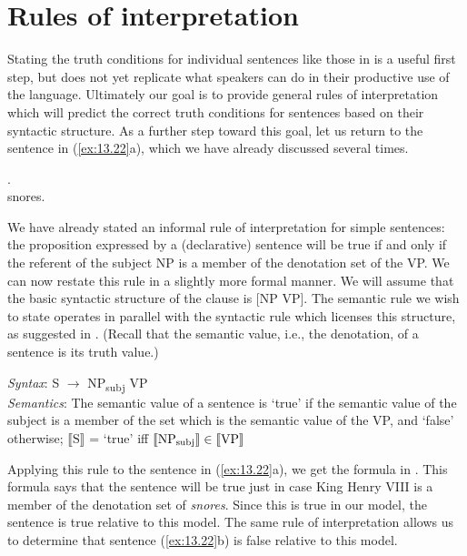 \pagebreak\section{Rules of interpretation}\label{sec:13.5}

Stating the truth conditions for individual sentences like those in  is a useful first step, but does not yet replicate what speakers can do in their productive use of the language. Ultimately our goal is to provide general rules of interpretation which will predict the correct truth conditions for sentences based on their syntactic structure. As a further step toward this goal, let us return to the sentence in (\ref{ex:13.22}a), which we have already discussed several times.


\ea \label{ex:13.22}
.\\
  {snores}.
                       \z
\z


We have already stated an informal rule of interpretation for simple sentences: the proposition expressed by a (declarative) sentence will be true if and only if the referent of the subject NP is a member of the denotation set of the VP. We can now restate this rule in a slightly more formal manner. We will assume that the basic syntactic structure of the clause is [NP VP]. The semantic rule we wish to state operates in parallel with the syntactic rule which licenses this structure, as suggested in . (Recall that the semantic value, i.e., the denotation, of a sentence is its truth value.)


\ea \label{ex:13.23}
\textit{Syntax}: S  $\rightarrow$  NP\textsubscript{subj}  VP\\
\textit{Semantics}: The semantic value of a sentence is ‘true’ if the semantic value of the subject is a member of the set which is the semantic value of the VP, and ‘false’ otherwise; {}$\llbracket\text{S}\rrbracket$  = ‘true’  iff  $\llbracket\text{NP\textsubscript{subj}}\rrbracket \in \llbracket\text{VP}\rrbracket$ 
\z


Applying this rule to the sentence in (\ref{ex:13.22}a), we get the formula in . This formula says that the sentence will be true just in case King Henry VIII is a member of the denotation set of \textit{snores}. Since this is true in our model, the sentence is true relative to this model. The same rule of interpretation allows us to determine that sentence (\ref{ex:13.22}b) is false relative to this model.


